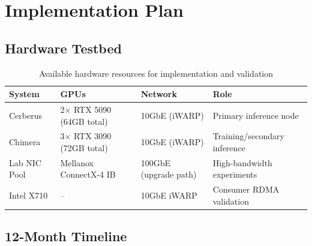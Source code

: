 \documentclass[11pt,letterpaper]{article}
\theoremstyle{definition}
\begin{document}
\section{Implementation Plan}

\subsection{Hardware Testbed}

\begin{table}[htbp]
\centering
\caption{Available hardware resources for implementation and validation}
\label{tab:hardware}
\begin{tabular}{@{}llll@{}}
\toprule
\textbf{System} & \textbf{GPUs} & \textbf{Network} & \textbf{Role} \\
\midrule
Cerberus & 2$\times$ RTX 5090 (64GB total) & 10GbE (iWARP) & Primary inference node \\
Chimera & 3$\times$ RTX 3090 (72GB total) & 10GbE (iWARP) & Training/secondary inference \\
Lab NIC Pool & Mellanox ConnectX-4 IB & 100GbE (upgrade path) & High-bandwidth experiments \\
Intel X710 & -- & 10GbE iWARP & Consumer RDMA validation \\
\bottomrule
\end{tabular}
\end{table}

\subsection{12-Month Timeline}
\end{document}
